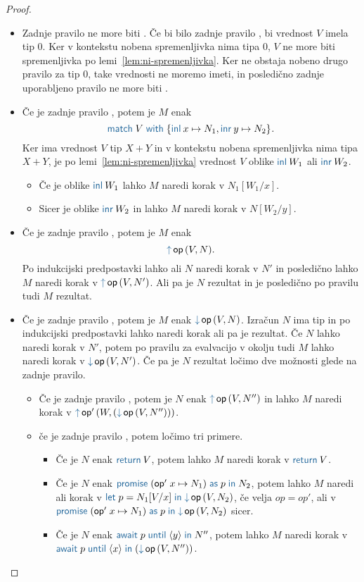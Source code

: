 \begin{proof}
\begin{itemize}
		\item Zadnje pravilo ne more biti .
		Če bi bilo zadnje pravilo , bi vrednost $V$ imela tip $0$. 
		Ker v kontekstu nobena spremenljivka nima tipa $0$, $V$ ne more biti spremenljivka po lemi~\ref{lem:ni-spremenljivka}.
		Ker ne obstaja nobeno drugo pravilo za tip $0$, take vrednosti ne moremo imeti, in posledično zadnje uporabljeno pravilo ne more biti .

		
		\item Če je zadnje pravilo , potem je $M$ enak $$\tmmatch{V}{\tminl{x} \mapsto N_1, \tminr{y} \mapsto N_2}.$$
		Ker ima vrednost $V$ tip $X + Y$ in v kontekstu nobena spremenljivka nima tipa $X + Y$, je po lemi~\ref{lem:ni-spremenljivka} vrednost $V$ oblike $\tminl{W_1}$ ali $\tminr{W_2}$.
		\begin{itemize}
			\item Če je oblike $\tminl{W_1}$ lahko $M$ naredi korak v $N_1[W_1/x]$.
			\item Sicer je oblike $\tminr{W_2}$ in lahko $M$ naredi korak v $N[W_2/y]$.
		\end{itemize}
		
		\item Če je zadnje pravilo , potem je $M$ enak $$\tmopout{op}{V}{N}.$$
		Po indukcijski predpostavki lahko ali $N$ naredi korak v $N'$ in posledično lahko $M$ naredi korak v $\tmopout{op}{V}{N'}$.
		Ali pa je $N$ rezultat in je posledično po pravilu  tudi $M$ rezultat.
		
		\item Če je zadnje pravilo , potem je $M$ enak $\tmopin{op}{V}{N}$.
		Izračun $N$ ima tip in po indukcijski predpostavki lahko naredi korak ali pa je rezultat.
		Če $N$ lahko naredi korak v $N'$, potem po pravilu za evalvacijo v okolju tudi $M$ lahko naredi korak v $\tmopin{op}{V}{N'}$. 
		Če pa je $N$ rezultat ločimo dve možnosti glede na zadnje pravilo.
		\begin{itemize}
			\item Če je zadnje pravilo , potem je $N$ enak $\tmopout{op}{V}{N''}$ in lahko $M$ naredi korak v $\tmopout{op'}{W}{(\tmopin{op}{V}{N''})}$.
			\item če je zadnje pravilo , potem ločimo tri primere.
			\begin{itemize}
				\item Če je $N$ enak $\tmreturn{V}$, potem lahko $M$ naredi korak v $\tmreturn{V}$.
				\item Če je $N$ enak $\tmwith{op'}{x}{N_1}{p}{N_2}$, potem lahko $M$ naredi ali korak v $\tmlet{p}{N_1[V/x]}{\tmopin{op}{V}{N_2}}$, če velja $op = op'$, ali v $\tmwith{op'}{x}{N_1}{p}{\tmopin{op}{V}{N_2}}$ sicer.
				\item Če je $N$ enak $\tmawait{p}{y}{N''}$, potem lahko $M$ naredi korak v $\tmawait{p}{x}{(\tmopin{op}{V}{N''})}$.
			\end{itemize}
		\end{itemize}
		

\end{itemize}
\end{proof}
